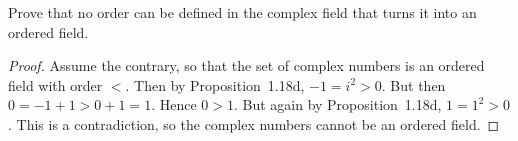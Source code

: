 
 Prove that no order can be defined in the complex field
that turns it into an ordered field.
\begin{proof}
  Assume the contrary, so that the set of complex numbers is an
  ordered field with order $<$. Then by Proposition~1.18d,
  $-1 = i^2 > 0$. But then $0 = -1 + 1 > 0 + 1 = 1$. Hence $0 >
  1$. But again by Proposition~1.18d, $1 = 1^2 > 0$. This is a
  contradiction, so the complex numbers cannot be an ordered field.
\end{proof}

